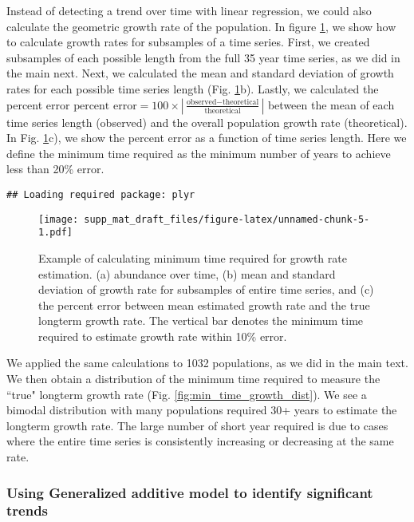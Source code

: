\documentclass[12pt,]{article}
\begin{document}
Instead of detecting a trend over time with linear regression, we could
also calculate the geometric growth rate of the population. In figure
\ref{fig:growth_rate}, we show how to calculate growth rates for
subsamples of a time series. First, we created subsamples of each
possible length from the full 35 year time series, as we did in the main
next. Next, we calculated the mean and standard deviation of growth
rates for each possible time series length (Fig.
\ref{fig:growth_rate}b). Lastly, we calculated the percent error
\(\mbox{percent error} = 100 \times \left| \frac{\mbox{observed} - \mbox{theoretical}}{\mbox{theoretical}} \right|\)
between the mean of each time series length (observed) and the overall
population growth rate (theoretical). In Fig. \ref{fig:growth_rate}c),
we show the percent error as a function of time series length. Here we
define the minimum time required as the minimum number of years to
achieve less than 20\% error.

\begin{verbatim}
## Loading required package: plyr
\end{verbatim}

\begin{figure}[htbp]
\centering
\texttt{[image: supp\_mat\_draft\_files/figure-latex/unnamed-chunk-5-1.pdf]}
\caption{Example of calculating minimum time required for growth rate
estimation. (a) abundance over time, (b) mean and standard deviation of
growth rate for subsamples of entire time series, and (c) the percent
error between mean estimated growth rate and the true longterm growth
rate. The vertical bar denotes the minimum time required to estimate
growth rate within 10\% error.\label{fig:growth_rate}}
\end{figure}

We applied the same calculations to 1032 populations, as we did in the
main text. We then obtain a distribution of the minimum time required to
measure the ``true" longterm growth rate (Fig.
\ref{fig:min_time_growth_dist}). We see a bimodal distribution with many
populations required 30+ years to estimate the longterm growth rate. The
large number of short year required is due to cases where the entire
time series is consistently increasing or decreasing at the same rate.

\clearpage 

\subsubsection{Using Generalized additive model to identify significant
trends}\label{using-generalized-additive-model-to-identify-significant-trends}
\end{document}
